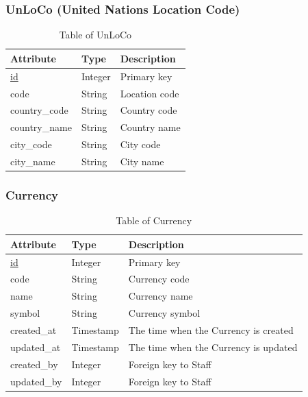 \subsubsection{UnLoCo (United Nations Location Code)}
\begin{table}[H]
    \centering
    \begin{tabular}{|p{3cm}|p{2cm}|p{\dimexpr\textwidth-6.8cm}|} %
        \hline
        \rowcolor[HTML]{C0C0C0} 
        \textbf{Attribute} & \textbf{Type} & \textbf{Description} \\ \hline
        \underline{id} & Integer & Primary key \\ \hline
        code & String & Location code \\ \hline
        country\_code & String & Country code \\ \hline
        country\_name & String & Country name \\ \hline
        city\_code & String & City code \\ \hline
        city\_name & String & City name \\ \hline
    \end{tabular}
    \caption{Table of UnLoCo}
    \label{tab:unloco-table}
\end{table}

\subsubsection{Currency}
\begin{table}[H]
    \centering
    \begin{tabular}{|p{3cm}|p{2cm}|p{\dimexpr\textwidth-6.8cm}|} %
        \hline
        \rowcolor[HTML]{C0C0C0} 
        \textbf{Attribute} & \textbf{Type} & \textbf{Description} \\ \hline
        \underline{id} & Integer & Primary key \\ \hline
        code & String & Currency code \\ \hline
        name & String & Currency name \\ \hline
        symbol & String & Currency symbol \\ \hline
        created\_at & Timestamp & The time when the Currency is created \\ \hline
        updated\_at & Timestamp & The time when the Currency is updated \\ \hline
        created\_by & Integer & Foreign key to Staff \\ \hline
        updated\_by & Integer & Foreign key to Staff \\ \hline
    \end{tabular}
    \caption{Table of Currency}
    \label{tab:currency-table}
\end{table}

